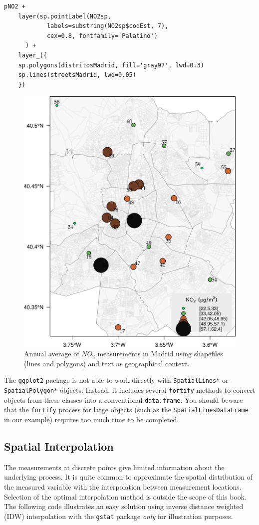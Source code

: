 \lstset{language=R,numbers=none}
\begin{lstlisting}
pNO2 +
    layer(sp.pointLabel(NO2sp,
			labels=substring(NO2sp$codEst, 7),
			cex=0.8, fontfamily='Palatino')
	  ) +
    layer_({
	sp.polygons(distritosMadrid, fill='gray97', lwd=0.3)
	sp.lines(streetsMadrid, lwd=0.05)
    })
\end{lstlisting}

\begin{figure}[htb]
\centering
\includegraphics[width=.9\linewidth]{figs/airMadrid.png}
\caption{\label{fig:airMadrid}Annual average of $NO_2$ measurements in Madrid using shapefiles (lines and polygons) and text as geographical context.}
\end{figure}

The \texttt{ggplot2} package is not able to work directly with
\texttt{SpatialLines*} or \texttt{SpatialPolygon*} objects. Instead, it includes
several \texttt{fortify} methods to convert objects from these classes into a
conventional \texttt{data.frame}. You should beware that the \texttt{fortify}
process for large objects (such as the \texttt{SpatialLinesDataFrame} in our
example) requires too much time to be completed.

\subsection{Spatial Interpolation}
\label{sec-1-5}
The measurements at discrete points give limited information about the
underlying process. It is quite common to approximate the spatial
distribution of the measured variable with the interpolation between
measurement locations. Selection of the optimal interpolation method
is outside the scope of this book. The following code illustrates an
easy solution using inverse distance weighted (IDW) interpolation with
the \texttt{gstat} package \cite{Pebesma2004} \emph{only} for illustration
purposes.

